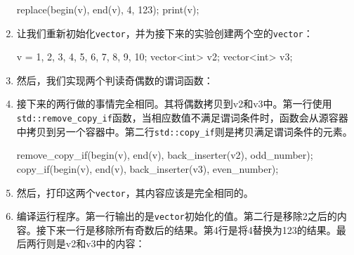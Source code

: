 \begin{enumerate}
\begin{codebox}[cpp]
replace(begin(v), end(v), 4, 123);
print(v);
\end{codebox}

\item 让我们重新初始化\texttt{vector}，并为接下来的实验创建两个空的\texttt{vector}：

\begin{codebox}[cpp]
    v = {1, 2, 3, 4, 5, 6, 7, 8, 9, 10};
    vector<int> v2;
    vector<int> v3;
\end{codebox}

\item 然后，我们实现两个判读奇偶数的谓词函数：


\item 接下来的两行做的事情完全相同。其将偶数拷贝到v2和v3中。第一行使用\texttt{std::remove\_copy\_if}函数，当相应数值不满足谓词条件时，函数会从源容器中拷贝到另一个容器中。第二行\texttt{std::copy\_if}则是拷贝满足谓词条件的元素。

\begin{codebox}[cpp]
remove_copy_if(begin(v), end(v),
    back_inserter(v2), odd_number);
copy_if(begin(v), end(v),
    back_inserter(v3), even_number); 
\end{codebox}

\item 然后，打印这两个\texttt{vector}，其内容应该是完全相同的。

\begin{codebox}[cpp]
    print(v2);
    print(v3);
}
\end{codebox}

\item 编译运行程序。第一行输出的是\texttt{vector}初始化的值。第二行是移除2之后的内容。接下来一行是移除所有奇数后的结果。第4行是将4替换为123的结果。最后两行则是v2和v3中的内容：


\end{enumerate}


